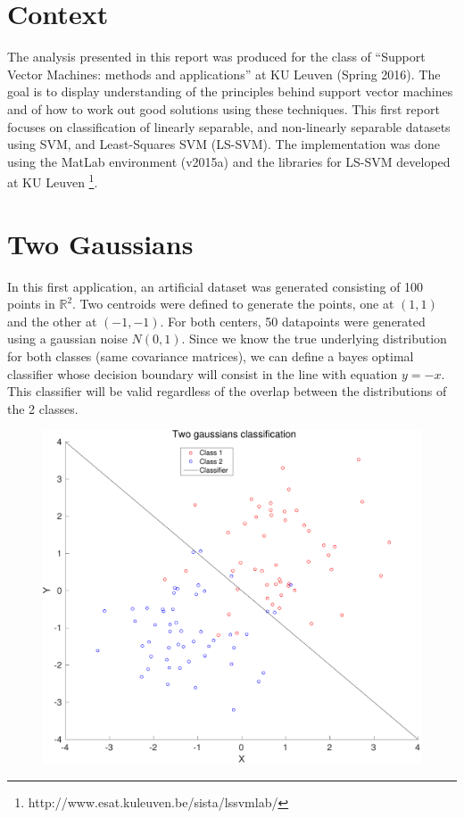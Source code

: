 \documentclass[11pt, a4paper]{article}
\begin{document}

\tableofcontents
\newpage

\section*{Context}

The analysis presented in this report was produced for the class of
``Support Vector Machines: methods and applications'' at KU Leuven
(Spring 2016). The goal is to display understanding of the principles
behind support vector machines and of how to work out good solutions
using these techniques. This first report focuses on classification of
linearly separable, and non-linearly separable datasets using SVM, and
Least-Squares SVM (LS-SVM). The implementation was done using the
MatLab environment (v2015a) and the libraries for LS-SVM developed at
KU Leuven \footnote{http://www.esat.kuleuven.be/sista/lssvmlab/}.

\section{Two Gaussians}

In this first application, an artificial dataset was generated
consisting of 100 points in $\mathbb{R}^2$. Two centroids were defined
to generate the points, one at $(1,1)$ and the other at $(-1,-1)$. For
both centers, 50 datapoints were generated using a gaussian noise
$N(0,1)$. Since we know the true underlying distribution for both
classes (same covariance matrices), we can define a bayes optimal
classifier whose decision boundary will consist in the line with
equation $y=-x$. This classifier will be valid regardless of the
overlap between the distributions of the 2 classes.

\begin{figure}[H]
    \centering
    \includegraphics[scale=.40]{two_gaussians.pdf}
    \label{fig:two_gaussians}
\end{figure}
\end{document}
